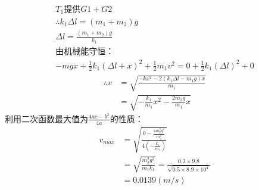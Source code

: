 \documentclass[b5paper,opensource]{./template/qyxf-book}
\begin{document}

\solve
\begin{gather*}
T_1\text{提供}G1+G2\\
\therefore k_1\Delta l=(m_1+m_2)g\\
\Delta l=\frac{(m_1+m_2)g}{k_1}\\
\text{由机械能守恒：}\\
-mgx+\frac{1}{2}k_1(\Delta l+x)^2+\frac{1}{2}m_1v^2=0+\frac{1}{2}k_1(\Delta l)^2+0
\end{gather*}
\begin{align*}
\therefore v&=\sqrt{\frac{-kx^2-2(k_1\Delta l-m_1g)x}{m_1}}\\
&=\sqrt{-\frac{k_1}{m_1}x^2-\frac{2m_2g}{m_1}x}
\end{align*}
利用二次函数最大值为$\frac{4ac-b^2}{4a}$的性质：
\begin{align*}
v_{max}	&=\sqrt{\frac{0-\frac{4m_2^2g^2}{m_1^2}}{4\left(-\frac{k_1}{m_1}\right)}}\\
&=\sqrt{\frac{m_2^2g^2}{m_1k_1}}=\frac{0.3\times 9.8}{\sqrt{0.5\times 8.9\times 10^4}}\\
&=0.0139(m/s)
\end{align*}
\end{document}
